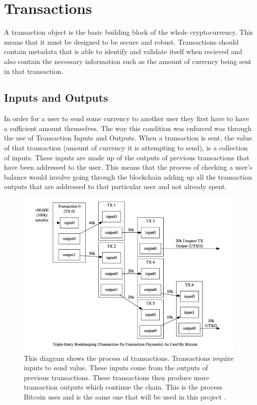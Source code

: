 \documentclass{l4proj}
\begin{document}
\section{Transactions}
A transaction object is the basic building block of the whole cryptocurrency. This means that it must be designed 
to be secure and robust. Transactions should contain metadata that is able to identify and validate itself when
recieved and also contain the necessary information such as the amount of currency being sent in that transaction.

\subsection{Inputs and Outputs}
In order for a user to send some currency to another user they first have to have a sufficient amount themselves. The
way this condition was enforced was through the use of Transaction Inputs and Outputs. When a transaction is
sent, the value of that transaction (amount of currency it is attempting to send), is a collection of inputs. These inputs
are made up of the outputs of previous transactions that have been addressed to the user. This means that the process of
checking a user's balance would involve going through the blockchain adding up all the transaction outputs that
are addressed to that particular user and not already spent.

\begin{figure}[!ht]
    \centering
    \includegraphics[width=1\linewidth]{images/utxo-model.jpg}    

    \caption{
        This diagram shows the process of transactions. Transactions require inputs to send value. These inputs come from
        the outputs of previous transactions. These transactions then produce more transaction outputs which continue
        the chain. This is the process Bitcoin uses and is the same one that will be used in this project \citep{bitcoinimage}. 
    }
    \label{fig:transaction} 
\end{figure}
\end{document}
